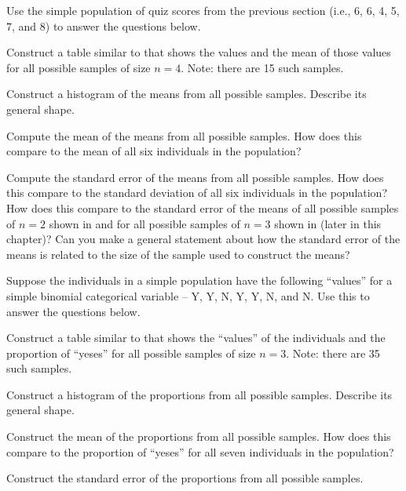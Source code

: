 \documentclass[10pt,openany]{book}\usepackage[]{graphicx}\usepackage[]{color}
\begin{document}
\begin{exsection}
  \item \label{revex:SamplingDistn3} Use the simple population of quiz scores from the previous section (i.e., 6, 6, 4, 5, 7, and 8) to answer the questions below. 
    \begin{Enumerate}
      \item Construct a table similar to  that shows the values and the mean of those values for all possible samples of size $n=4$.  Note: there are 15 such samples.
      \item Construct a histogram of the means from all possible samples.  Describe its general shape.
      \item Compute the mean of the means from all possible samples.  How does this compare to the mean of all six individuals in the population?
      \item Compute the standard error of the means from all possible samples.  How does this compare to the standard deviation of all six individuals in the population?  How does this compare to the standard error of the means of all possible samples of $n=2$ shown in  and for all possible samples of $n=3$ shown in  (later in this chapter)?  Can you make a general statement about how the standard error of the means is related to the size of the sample used to construct the means?
    \end{Enumerate}

  \item \label{revex:SamplingDistp2} Suppose the individuals in a simple population have the following ``values'' for a simple binomial categorical variable -- Y, Y, N, Y, Y, N, and N.  Use this to answer the questions below. 
    \begin{Enumerate}
      \item Construct a table similar to  that shows the ``values'' of the individuals and the proportion of ``yeses'' for all possible samples of size $n=3$.  Note: there are 35 such samples.
      \item Construct a histogram of the proportions from all possible samples.  Describe its general shape.
      \item Construct the mean of the proportions from all possible samples.  How does this compare to the proportion of ``yeses'' for all seven individuals in the population?
      \item Construct the standard error of the proportions from all possible samples.
    \end{Enumerate}
\end{exsection}
\end{document}
